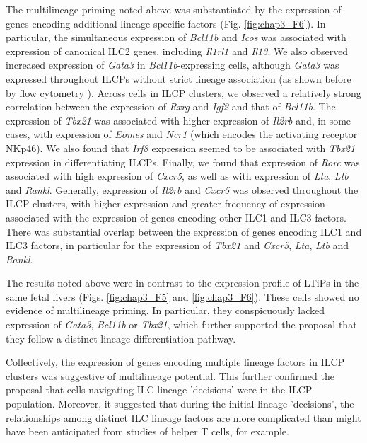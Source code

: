 The multilineage priming noted above was substantiated by the expression of genes encoding additional lineage-specific factors (Fig. \ref{fig:chap3_F6}). In particular, the simultaneous expression of \textit{Bcl11b} and \textit{Icos} was associated with expression of canonical ILC2 genes, including \textit{Il1rl1} and \textit{Il13}. We also observed increased expression of \textit{Gata3} in \textit{Bcl11b}-expressing cells, although \textit{Gata3} was expressed throughout ILCPs without strict lineage association (as shown before by flow cytometry \cite{constantinides2014}). Across cells in ILCP clusters, we observed a relatively strong correlation between the expression of \textit{Rxrg} and \textit{Igf2} and that of \textit{Bcl11b}. The expression of \textit{Tbx21} was associated with higher expression of \textit{Il2rb} and, in some cases, with expression of \textit{Eomes} and \textit{Ncr1} (which encodes the activating receptor NKp46). We also found that \textit{Irf8} expression seemed to be associated with \textit{Tbx21} expression in differentiating ILCPs. Finally, we found that expression of \textit{Rorc} was associated with high expression of \textit{Cxcr5}, as well as with expression of \textit{Lta}, \textit{Ltb} and \textit{Rankl}. Generally, expression of \textit{Il2rb} and \textit{Cxcr5} was observed throughout the ILCP clusters, with higher expression and greater frequency of expression associated with the expression of genes encoding other ILC1 and ILC3 factors. There was substantial overlap between the expression of genes encoding ILC1 and ILC3 factors, in particular for the expression of \textit{Tbx21} and \textit{Cxcr5}, \textit{Lta}, \textit{Ltb} and \textit{Rankl}.

The results noted above were in contrast to the expression profile of LTiPs in the same fetal livers (Figs. \ref{fig:chap3_F5} and \ref{fig:chap3_F6}). These cells showed no evidence of multilineage priming. In particular, they conspicuously lacked expression of \textit{Gata3}, \textit{Bcl11b} or \textit{Tbx21}, which further supported the proposal that they follow a distinct lineage-differentiation pathway.

Collectively, the expression of genes encoding multiple lineage factors in ILCP clusters was suggestive of multilineage potential. This further confirmed the proposal that cells navigating ILC lineage 'decisions' were in the ILCP population. Moreover, it suggested that during the initial lineage 'decisions', the relationships among distinct ILC lineage factors are more complicated than might have been anticipated from studies of helper T cells, for example.

